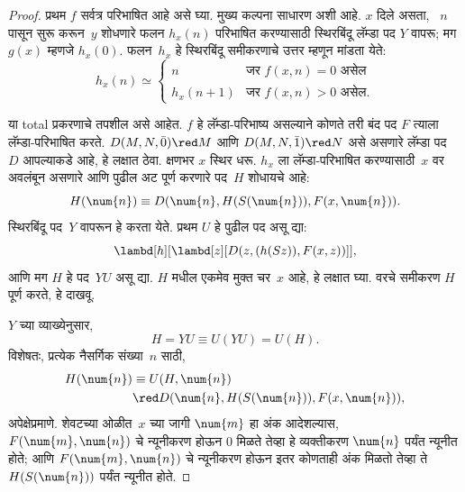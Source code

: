 \begin{proof}

प्रथम $f$ सर्वत्र परिभाषित आहे असे घ्या. मुख्य कल्पना साधारण अशी आहे. $x$ दिले असता,
~$n$ पासून सुरू करून~$y$ शोधणारे फलन $h_x(n)$
परिभाषित करण्यासाठी स्थिरबिंदू लॅम्डा पद $Y$ वापरू;
मग $g(x)$ म्हणजे $h_x(0)$. फलन~$h_x$ हे
स्थिरबिंदू समीकरणाचे उत्तर म्हणून मांडता येते:
\[h_x(n) \simeq
\begin{cases}
n & \text{जर $f(x,n) = 0$ असेल} \\
h_x(n+1) & \text{जर $f(x,n)>0$ असेल.}
\end{cases}
\]

या total प्रकरणाचे तपशील असे आहेत. $f$ हे लॅम्डा-परिभाष्य असल्याने
कोणते तरी बंद पद $F$ त्याला लॅम्डा-परिभाषित करते.
$D(M, N, \bar{0}) \red M$ आणि $D(M, N, \bar{1})
\red N$ असे असणारे लॅम्डा पद~$D$ आपल्याकडे आहे,
हे लक्षात ठेवा. क्षणभर $x$ स्थिर धरू. $h_x$ ला
लॅम्डा-परिभाषित करण्यासाठी~$x$ वर अवलंबून असणारे
आणि पुढील अट पूर्ण करणारे पद~$H$ शोधायचे आहे:
\[H(\num{n}) \equiv D(\num{n}, H(S(\num{n})), F(x, \num{n})).
\]
स्थिरबिंदू पद~$Y$ वापरून हे करता येते. प्रथम $U$
हे पुढील पद असू द्या:
\[\lambd[h][\lambd[z][D(z,(h(Sz)),F(x,z))]],
\]
आणि मग $H$ हे पद~$YU$ असू द्या. $H$ मधील
एकमेव मुक्त चर~$x$ आहे, हे लक्षात घ्या. वरचे
समीकरण $H$ पूर्ण करते, हे दाखवू.

$Y$ च्या व्याख्येनुसार,
\[H = YU \equiv U(YU) = U(H).
\]
विशेषतः, प्रत्येक नैसर्गिक संख्या~$n$ साठी,
\begin{align*}
H(\num{n}) & \equiv U(H, \num{n}) \\
& \red D(\num{n}, H(S(\num{n})), F(x, \num{n})),
\end{align*}
अपेक्षेप्रमाणे. शेवटच्या ओळीत~$x$ च्या जागी
$\num{m}$ हा अंक आदेशल्यास,
$F(\num{m}, \num{n})$ चे न्यूनीकरण होऊन
$\num{0}$ मिळते तेव्हा हे व्यक्तीकरण $\num{n}$
पर्यंत न्यूनीत होते; आणि $F(\num{m}, \num{n})$
चे न्यूनीकरण होऊन इतर कोणताही अंक मिळतो तेव्हा
ते $H(S(\num{n}))$ पर्यंत न्यूनीत होते.


\end{proof}
